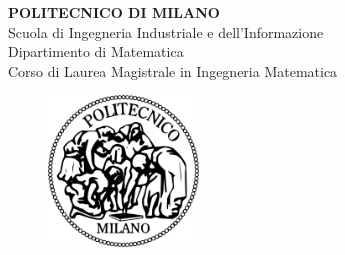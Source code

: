 \begin{titlepage}




\thispagestyle{empty}%
%
\enlargethispage*{10cm}
%
\setlength{\hoffset}{-1in}
\setlength{\voffset}{-1in}

\setlength{\textheight}{220mm}
\setlength{\textwidth}{158mm}

\setlength{\evensidemargin}{36mm}
\setlength{\oddsidemargin}{36mm}
\setlength{\marginparwidth}{0mm}
\setlength{\marginparsep}{0mm}

\setlength{\topmargin}{0pt}
\setlength{\headheight}{0pt}
\setlength{\headsep}{0pt}

\setlength{\footskip}{0mm}




\begin{center}


\vspace*{30mm}
\Large{\textbf{POLITECNICO DI MILANO}}\\[5mm]

\large{Scuola di Ingegneria Industriale e dell'Informazione}\\
\large{Dipartimento di Matematica}\\[5mm]

\large{Corso di Laurea Magistrale in Ingegneria Matematica}\\[15mm]


\begin{figure}[htbp]
	\begin{center}
		\includegraphics[width=4.0cm]{Figure/Politecnico-di-Milano-logo.png}
	\end{center}
\end{figure}



\end{center}
\end{titlepage}
